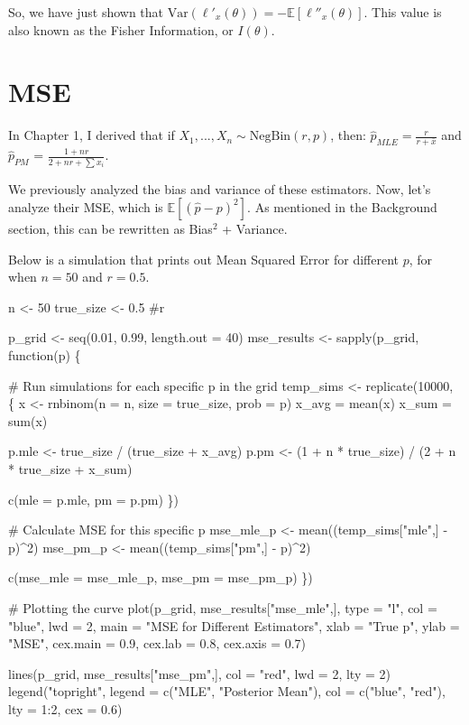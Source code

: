 \documentclass[
  letterpaper,
  DIV=11,
  numbers=noendperiod]{scrreprt}
\newenvironment{Shaded}{\begin{snugshade}}{\end{snugshade}}
\newcommand{\NormalTok}[1]{\textcolor[rgb]{0.00,0.23,0.31}{#1}}
\begin{document}
So, we have just shown that
\(\text{Var}(\ell'_x(\theta)) = -\mathbb{E}[\ell''_x(\theta)]\). This
value is also known as the Fisher Information, or \(I(\theta)\).

\section{MSE}\label{mse}

In Chapter 1, I derived that if
\(X_1,...,X_n \sim \text{NegBin}(r, p)\), then:
\(\hat{p}_{MLE} = \frac{r}{r + \bar{x}}\) and \(\hat{p}_{PM}\) =
\(\frac{1 + nr}{2 + nr + \sum x_i}\).

We previously analyzed the bias and variance of these estimators. Now,
let's analyze their MSE, which is \(\mathbb{E}[(\hat{p} - p)^2]\). As
mentioned in the Background section, this can be rewritten as Bias\(^2\)
+ Variance.

Below is a simulation that prints out Mean Squared Error for different
\(p\), for when \(n=50\) and \(r=0.5\).

\begin{Shaded}
\begin{Highlighting}[]
\NormalTok{n \textless{}{-} 50 }
\NormalTok{true\_size \textless{}{-} 0.5 \#r}

\NormalTok{p\_grid \textless{}{-} seq(0.01, 0.99, length.out = 40)}
\NormalTok{mse\_results \textless{}{-} sapply(p\_grid, function(p) \{}
  
\NormalTok{  \# Run simulations for each specific p in the grid}
\NormalTok{  temp\_sims \textless{}{-} replicate(10000, \{}
\NormalTok{    x \textless{}{-} rnbinom(n = n, size = true\_size, prob = p)}
\NormalTok{    x\_avg = mean(x)}
\NormalTok{    x\_sum = sum(x)}
    
\NormalTok{    p.mle \textless{}{-} true\_size / (true\_size + x\_avg)}
\NormalTok{    p.pm \textless{}{-} (1 + n * true\_size) / (2 + n * true\_size + x\_sum)}
    
\NormalTok{    c(mle = p.mle, pm = p.pm)}
\NormalTok{  \})}
  
\NormalTok{  \# Calculate MSE for this specific p}
\NormalTok{  mse\_mle\_p \textless{}{-} mean((temp\_sims["mle",] {-} p)\^{}2)}
\NormalTok{  mse\_pm\_p \textless{}{-} mean((temp\_sims["pm",] {-} p)\^{}2)}
  
\NormalTok{  c(mse\_mle = mse\_mle\_p, mse\_pm = mse\_pm\_p)}
\NormalTok{\})}

\NormalTok{\# Plotting the curve}
\NormalTok{plot(p\_grid, mse\_results["mse\_mle",], type = "l", col = "blue", lwd = 2,}
\NormalTok{     main = "MSE for Different Estimators", }
\NormalTok{     xlab = "True p", }
\NormalTok{     ylab = "MSE",}
\NormalTok{     cex.main = 0.9,  }
\NormalTok{     cex.lab = 0.8,   }
\NormalTok{     cex.axis = 0.7)}

\NormalTok{lines(p\_grid, mse\_results["mse\_pm",], col = "red", lwd = 2, lty = 2)}
\NormalTok{legend("topright", }
\NormalTok{       legend = c("MLE", "Posterior Mean"), }
\NormalTok{       col = c("blue", "red"), }
\NormalTok{       lty = 1:2,}
\NormalTok{       cex = 0.6)}
\end{Highlighting}
\end{Shaded}
\end{document}
